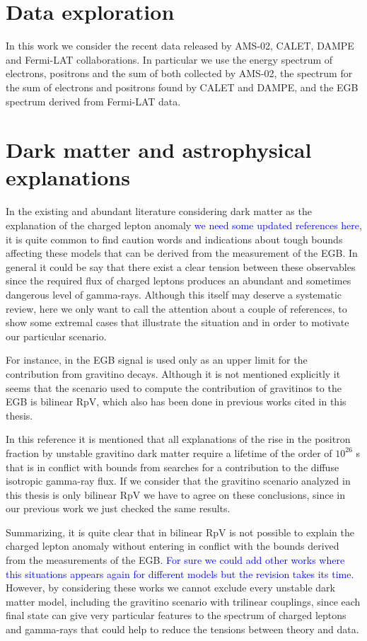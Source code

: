 \documentclass[a4paper,11pt]{article}
\newcommand*{\blue}{\textcolor{blue}}
\begin{document}
\section{Data exploration}

In this work we consider the recent data released by AMS-02, CALET, DAMPE and Fermi-LAT collaborations. In particular we use the energy spectrum of electrons, positrons and the sum of both collected by AMS-02, the spectrum for the sum of electrons and positrons found by CALET and DAMPE, and the EGB spectrum derived from Fermi-LAT data.

\section{Dark matter and astrophysical explanations}

In the existing and abundant literature considering dark matter as the explanation of the charged lepton anomaly \blue{we need some updated references here}, it is quite common to find caution words and indications about tough bounds affecting these models that can be derived from the measurement of the EGB. In general it could be say that there exist a clear tension between these observables since the required flux of charged leptons produces an abundant and sometimes dangerous level of gamma-rays. Although this itself may deserve a systematic review, here we only want to call the attention about a couple of references, to show some extremal cases that illustrate the situation and in order to motivate our particular scenario.

For instance, in \cite{Grefe:2011dp} the EGB signal is used only as an upper limit for the contribution from gravitino decays. Although it is not mentioned explicitly it seems that the scenario used to compute the contribution of gravitinos to the EGB is bilinear RpV, which also has been done in previous works cited in this thesis. 

In this reference it is mentioned that all explanations of the rise in the positron fraction by unstable gravitino dark matter require a lifetime of the order of $10^{26}$ s that is in conflict with bounds from searches for a contribution to the diffuse isotropic gamma-ray flux. If we consider that the gravitino scenario analyzed in this thesis is only bilinear RpV we have to agree on these conclusions, since in our previous work we just checked the same results. 

Summarizing, it is quite clear that in bilinear RpV is not possible to explain the charged lepton anomaly without entering in conflict with the bounds derived from the measurements of the EGB. \blue{For sure we could add other works where this situations appears again for different models but the revision takes its time.} However, by considering these works we cannot exclude every unstable dark matter model, including the gravitino scenario with trilinear couplings, since each final state can give very particular features to the spectrum of charged leptons and gamma-rays that could help to reduce the tensions between theory and data.
\end{document}
